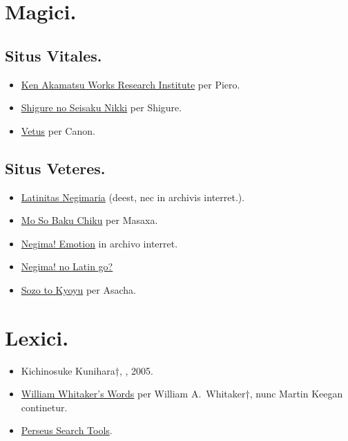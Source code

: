 \documentclass[12pt]{book}
\begin{document}
\section*{Magici.}\label{source-magia}
\subsection*{Situs Vitales.}\label{active-websites}

\begin{itemize}
  \item \href{http://www2u.biglobe.ne.jp/~clown/}{Ken Akamatsu Works Research Institute} per Piero. %
  \item \href{http://tuwabuki20.blog5.fc2.com/}{Shigure no Seisaku Nikki} per Shigure. %
  \item \href{https://vetus.wordpress.com/}{Vetus} per Canon.
\end{itemize}

\subsection*{Situs Veteres.}\label{oldies}

\begin{itemize}
  \item \href{http://www.genvid.com/diesgaudii/latin/ln/index.html}{Latinitas Negimaria} (deest, nec in archivis interret.).
  \item \href{https://blog.goo.ne.jp/masaxa}{Mo So Baku Chiku} per Masaxa. %
  \item \href{https://web.archive.org/web/20150419192906/http://www7b.biglobe.ne.jp/~meril/index.html}{Negima! Emotion} in archivo interret. %
  \item \href{https://blog.goo.ne.jp/lowtech224}{Negima! no Latin go?} %
  \item \href{https://asacha.hatenadiary.org/}{Sozo to Kyoyu} per Asacha. %
\end{itemize}

\section*{Lexici.}\label{lexicons}

\begin{itemize}
  \item Kichinosuke Kunihara†, , 2005. %
  \item \href{https://github.com/mk270/whitakers-words}{William Whitaker's Words} per William A.\ Whitaker†, nunc Martin Keegan continetur.
  \item \href{http://www.perseus.tufts.edu/hopper/search}{Perseus Search Tools}.
\end{itemize}
\end{document}
